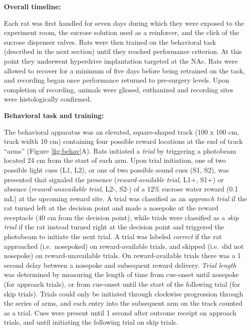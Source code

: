 \documentclass[11pt]{article}
\begin{document}
{\bf Overall timeline:}

Each rat was first handled for seven days during which they were
exposed to the experiment room, the sucrose solution used as a
reinforcer, and the click of the sucrose dispenser valves. Rats were
then trained on the behavioral task (described in the next section)
until they reached performance criterion. At this point they
underwent hyperdrive implantation targeted at the NAc. Rats were
allowed to recover for a minimum of five days before being retrained
on the task, and recording began once performance returned to
pre-surgery levels. Upon completion of recording, animals were gliosed,
euthanized and recording sites were histologically confirmed.

{\bf Behavioral task and training:}

The behavioral apparatus was an elevated, square-shaped track (100 x
100 cm, track width 10 cm) containing four possible reward locations
at the end of track ``arms'' (Figure \ref{fig:behav}A). Rats initiated a
{\it trial} by triggering a photobeam located 24 cm from the start of
each arm. Upon trial initiation, one of two possible light cues (L1,
L2), or one of two possible sound cues (S1, S2), was presented that
signaled the presence ({\it reward-available trial}, L1+, S1+) or
absence ({\it reward-unavailable trial}, L2-, S2-) of a 12\% sucrose
water reward (0.1 mL) at the upcoming reward site. A trial was
classified as an {\it approach trial} if the rat turned left at the
decision point and made a nosepoke at the reward receptacle (40 cm
from the decision point), while trials were classified as a {\it skip
trial} if the rat instead turned right at the decision point and
triggered the photobeam to initiate the next trial. A trial was labeled
{\it correct} if the rat approached (i.e.\ nosepoked) on
reward-available trials, and skipped (i.e.\ did not nosepoke) on
reward-unavailable trials. On reward-available trials there was a 1
second delay between a nosepoke and subsequent reward delivery. {\it
Trial length} was determined by measuring the length of time from
cue-onset until nosepoke (for approach trials), or from cue-onset
until the start of the following trial (for skip trials). Trials could
only be initiated through clockwise progression through the series of
arms, and each entry into the subsequent arm on the track counted as a
trial. Cues were present until 1  second after outcome receipt on approach trials, and until initiating the following trial on skip trials.
\end{document}

